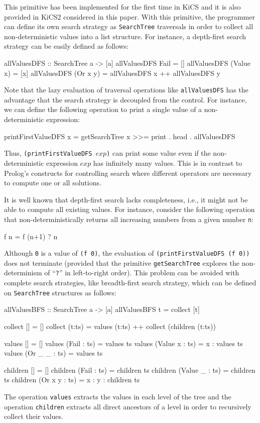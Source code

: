 \documentclass[english]{lni}
\newcommand{\code}[1]{\texttt{\small{}#1}}
\newcommand{\ccode}[1]{``\code{#1}''}
\begin{document}
This primitive has been implemented for the first time
in KiCS \cite{BrasselHuch07,BrasselHuch09}
and it is also provided in KiCS2 \cite{BrasselHanusPeemoellerReck11}
considered in this paper.
With this primitive,
the programmer can define its own search strategy as
\code{SearchTree} traversals in order to
collect all non-deterministic values into a list structure.
For instance, a depth-first search strategy can be easily defined
as follows:
\begin{curry}
allValuesDFS :: SearchTree a -> [a]
allValuesDFS Fail      = []
allValuesDFS (Value x) = [x]
allValuesDFS (Or x y)  = allValuesDFS x ++ allValuesDFS y
\end{curry}
Note that the lazy evaluation of traversal operations like
\code{allValuesDFS} has the advantage that the search strategy
is decoupled from the control. For instance, we can define
the following operation to print a single value
of a non-deterministic expression:
\begin{curry}
printFirstValueDFS x =
  getSearchTree x >>= print . head . allValuesDFS
\end{curry}
Thus, \code{(printFirstValueDFS $exp$)} can print some value
even if the non-deterministic expression $exp$ has infinitely many values.
This is in contrast to Prolog's constructs for controlling
search where different operators are necessary to compute
one or all solutions.

It is well known that depth-first search lacks completeness,
i.e., it might not be able to compute all existing values.
For instance, consider the following operation
that non-deterministically returns all increasing numbers
from a given number \code{n}:
\begin{curry}
f n = f (n+1) ? n
\end{curry}
Although \code{0} is a value of \code{(f 0)},
the evaluation of \code{(printFirstValueDFS (f 0))} does not terminate
(provided that the primitive \code{getSearchTree}
explores the non-determinism of \ccode{?} in left-to-right order).
This problem can be avoided with complete search strategies,
like breadth-first search strategy,
which can be defined on \code{SearchTree} structures as follows:
%
\begin{curry}
allValuesBFS :: SearchTree a -> [a]
allValuesBFS t = collect [t]

collect []     = []
collect (t:ts) = values (t:ts) ++ collect (children (t:ts))

values []             = []
values (Fail    : ts) = values ts
values (Value x : ts) = x : values ts
values (Or _ _  : ts) = values ts

children []             = []
children (Fail    : ts) = children ts
children (Value _ : ts) = children ts
children (Or x y  : ts) = x : y : children ts
\end{curry}
%
The operation \code{values} extracts the values
in each level of the tree and the operation \code{children}
extracts all direct ancestors of a level in order to recursively
collect their values.
\end{document}
